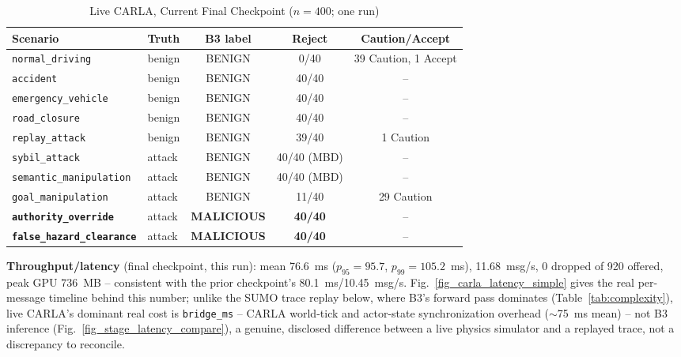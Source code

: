 \documentclass[conference]{IEEEtran}
\begin{document}
\begin{table}[t]
\centering
\caption{Live CARLA, Current Final Checkpoint ($n{=}400$; one run)}
\label{tab:carla}
\footnotesize
\begin{tabular}{@{}llccc@{}}
\toprule
Scenario & Truth & B3 label & Reject & Caution/Accept \\
\midrule
\texttt{normal\_driving} & benign & BENIGN & 0/40 & 39 Caution, 1 Accept \\
\texttt{accident} & benign & BENIGN & 40/40 & -- \\
\texttt{emergency\_vehicle} & benign & BENIGN & 40/40 & -- \\
\texttt{road\_closure} & benign & BENIGN & 40/40 & -- \\
\texttt{replay\_attack} & benign & BENIGN & 39/40 & 1 Caution \\
\texttt{sybil\_attack} & attack & BENIGN & 40/40 (MBD) & -- \\
\texttt{semantic\_manipulation} & attack & BENIGN & 40/40 (MBD) & -- \\
\texttt{goal\_manipulation} & attack & BENIGN & 11/40 & 29 Caution \\
\textbf{\texttt{authority\_override}} & attack & \textbf{MALICIOUS} & \textbf{40/40} & -- \\
\textbf{\texttt{false\_hazard\_clearance}} & attack & \textbf{MALICIOUS} & \textbf{40/40} & -- \\
\bottomrule
\end{tabular}
\end{table}

\textbf{Throughput/latency} (final checkpoint, this run): mean 76.6~ms ($p_{95}{=}95.7$, $p_{99}{=}105.2$~ms), 11.68~msg/s, 0 dropped of 920 offered, peak GPU 736~MB -- consistent with the prior checkpoint's 80.1~ms/10.45~msg/s. Fig.~\ref{fig_carla_latency_simple} gives the real per-message timeline behind this number; unlike the SUMO trace replay below, where B3's forward pass dominates (Table~\ref{tab:complexity}), live CARLA's dominant real cost is \texttt{bridge\_ms} -- CARLA world-tick and actor-state synchronization overhead ($\sim$75~ms mean) -- not B3 inference (Fig.~\ref{fig_stage_latency_compare}), a genuine, disclosed difference between a live physics simulator and a replayed trace, not a discrepancy to reconcile.
\end{document}
